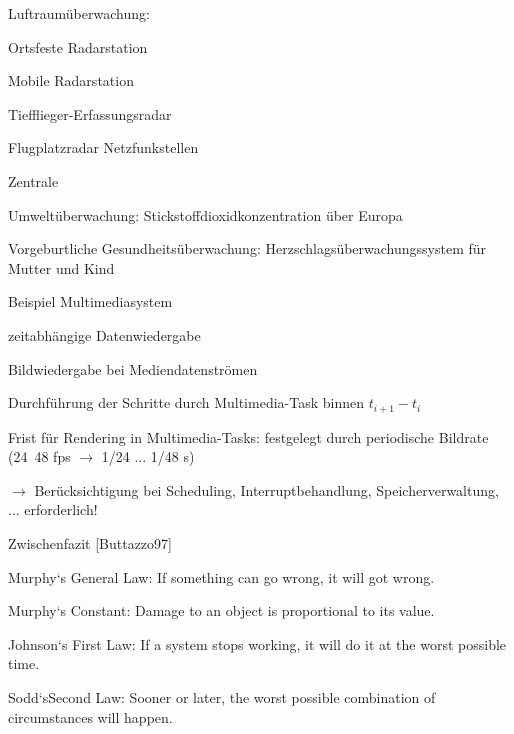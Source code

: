 \documentclass[a4paper]{article}
\begin{document}
\begin{multicols}{3}
    \begin{itemize*}
        \item
        Luftraumüberwachung:
        \begin{itemize*}
            \item Ortsfeste Radarstation
            \item Mobile Radarstation
            \item Tiefflieger-Erfassungsradar
            \item Flugplatzradar Netzfunkstellen
            \item Zentrale
        \end{itemize*}
        \item
        Umweltüberwachung: Stickstoffdioxidkonzentration über Europa
        \item
        Vorgeburtliche Gesundheitsüberwachung: Herzschlagsüberwachungssystem
        für Mutter und Kind
    \end{itemize*}

    Beispiel Multimediasystem

    \begin{itemize*}
        \item
        zeitabhängige Datenwiedergabe
        \item
        Bildwiedergabe bei Mediendatenströmen
        \item
        Durchführung der Schritte durch Multimedia-Task binnen $t_{i+1} -
            t_i$
        \item
        Frist für Rendering in Multimedia-Tasks: festgelegt durch periodische
        Bildrate (24~48 fps $\rightarrow$ 1/24
        ... 1/48 s)
        \item
        $\rightarrow$ Berücksichtigung bei Scheduling,
        Interruptbehandlung, Speicherverwaltung, ... erforderlich!
    \end{itemize*}

    Zwischenfazit [Buttazzo97]

    \begin{itemize*}
        \item
        Murphy`s General Law: If something can go wrong, it will got wrong.
        \item
        Murphy`s Constant: Damage to an object is proportional to its value.
        \item
        Johnson`s First Law: If a system stops working, it will do it at the
        worst possible time.
        \item
        Sodd`sSecond Law: Sooner or later, the worst possible combination of
        circumstances will happen.
    \end{itemize*}


\end{multicols}
\end{document}
